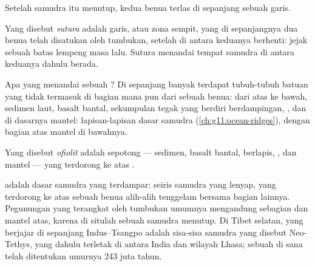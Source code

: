 Setelah samudra itu menutup, kedua benua terlas di sepanjang sebuah garis.

\begin{definition}[Sutura]\label{def:g12:mountain-building:suture}
Yang disebut \emph{sutura} adalah garis, atau zona sempit, yang
di sepanjangnya dua benua telah disatukan oleh tumbukan, setelah  di
antara keduanya berhenti: jejak sebuah batas lempeng masa lalu. Sutura
menandai tempat samudra di antara keduanya dahulu berada.
\end{definition}

Apa yang menandai sebuah ? Di sepanjang banyak  terdapat tubuh-tubuh
batuan yang tidak termasuk di bagian mana pun dari sebuah benua: dari atas ke
bawah, sedimen laut, basalt bantal, sekumpulan  tegak yang berdiri
berdampingan, , dan di dasarnya  mantel: lapisan-lapisan dasar
samudra (\cref{ch:g11:ocean-ridges}), dengan bagian atas mantel di bawahnya.

\begin{definition}[Ofiolit]\label{def:g12:mountain-building:ophiolite}
Yang disebut \emph{ofiolit} adalah sepotong  ---
sedimen, basalt bantal,  berlapis, , dan  mantel --- yang
terdorong ke atas .
\end{definition}

 adalah dasar samudra yang terdampar: seiris samudra yang lenyap, yang
terdorong ke atas sebuah benua alih-alih tenggelam bersama bagian lainnya.
Pegunungan yang terangkat oleh tumbukan umumnya mengandung sebagian  dan mantel atas, karena di situlah sebuah samudra menutup. Di Tibet
selatan,  yang berjajar di sepanjang  Indus--Tsangpo
adalah sisa-sisa samudra yang disebut Neo-Tethys, yang dahulu terletak di
antara India dan wilayah Lhasa; sebuah  di sana telah ditentukan umurnya
243 juta tahun.

